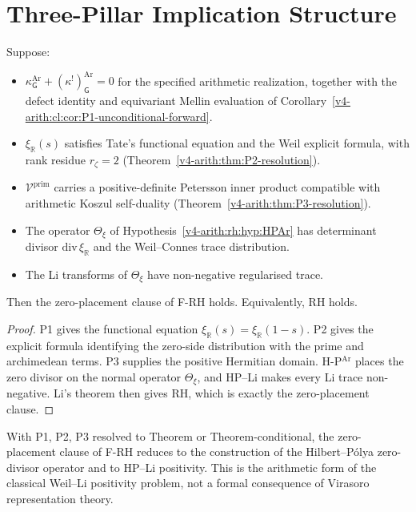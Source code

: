\section{Three-Pillar Implication Structure}
\label{v4-arith:rh:three-pillar}

\begin{theorem}
\label{v4-arith:rh:thm:three-pillar-implication}
Suppose:
\begin{itemize}
\item[(P1)] \(\kappa^{\mathrm{Ar}}_{\mathsf{G}}+(\kappa^{!})^{\mathrm{Ar}}_{\mathsf{G}}=0\)
for the specified arithmetic realization, together with the defect
identity and equivariant Mellin evaluation of
Corollary~\ref{v4-arith:cl:cor:P1-unconditional-forward}.
\item[(P2)] \(\xi_{\mathbb R}(s)\) satisfies Tate's functional equation
and the Weil explicit formula, with rank residue \(r_{\zeta}=2\)
(Theorem~\ref{v4-arith:thm:P2-resolution}).
\item[(P3)] \(\mathcal{V}^{\mathrm{prim}}\) carries a positive-definite
Petersson inner product compatible with arithmetic Koszul self-duality
(Theorem~\ref{v4-arith:thm:P3-resolution}).
\item[(H-P\(^{\mathrm{Ar}}\))] The operator \(\Theta_\xi\) of
Hypothesis~\ref{v4-arith:rh:hyp:HPAr} has determinant divisor
\(\mathrm{div}\,\xi_{\mathbb R}\) and the Weil--Connes trace distribution.
\item[(HP--Li)] The Li transforms of \(\Theta_\xi\) have non-negative
regularised trace.
\end{itemize}
Then the zero-placement clause of F-RH holds. Equivalently, RH holds.
\end{theorem}

\begin{proof}
P1 gives the functional equation \(\xi_{\mathbb R}(s)=\xi_{\mathbb R}(1-s)\).
P2 gives the explicit formula identifying the zero-side distribution
with the prime and archimedean terms. P3 supplies the positive
Hermitian domain. H-P\(^{\mathrm{Ar}}\) places the zero divisor on the
normal operator \(\Theta_\xi\), and HP--Li makes every Li trace
non-negative. Li's theorem then gives RH, which is exactly the
zero-placement clause.
\end{proof}

\begin{remark}
\label{v4-arith:rh:rem:VB-single-open}
With P1, P2, P3 resolved to Theorem or Theorem-conditional,
the zero-placement clause of F-RH reduces to the construction of the
Hilbert--P\'olya zero-divisor operator and to HP--Li positivity. This is
the arithmetic form of the classical Weil--Li positivity problem, not a
formal consequence of Virasoro representation theory.
\end{remark}

